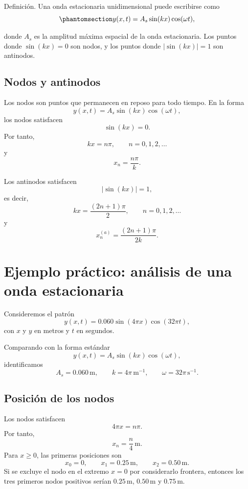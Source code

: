 \documentclass[
  letterpaper,
  DIV=11,
  numbers=noendperiod]{scrreprt}
\begin{document}
\begin{tcolorbox}[enhanced jigsaw, bottomrule=.15mm, rightrule=.15mm, colframe=quarto-callout-note-color-frame, leftrule=.75mm, breakable, arc=.35mm, toprule=.15mm, left=2mm, colback=white, opacityback=0]

Definición. Una onda estacionaria unidimensional puede escribirse como
\begin{equation}\phantomsection\label{eq-standing-wave}{
y(x,t)=A_s\sin(kx)\cos(\omega t),
}\end{equation}

\end{tcolorbox}

donde \(A_s\) es la amplitud máxima espacial de la onda estacionaria.
Los puntos donde \(\sin(kx)=0\) son nodos, y los puntos donde
\(|\sin(kx)|=1\) son antinodos.

\subsection{Nodos y antinodos}\label{nodos-y-antinodos}

Los nodos son puntos que permanecen en reposo para todo tiempo. En la
forma \[
y(x,t)=A_s\sin(kx)\cos(\omega t),
\] los nodos satisfacen \[
\sin(kx)=0.
\] Por tanto, \[
kx=n\pi, \qquad n=0,1,2,\dots
\] y \[
x_n=\frac{n\pi}{k}.
\]

Los antinodos satisfacen \[
|\sin(kx)|=1,
\] es decir, \[
kx=\frac{(2n+1)\pi}{2}, \qquad n=0,1,2,\dots
\] y \[
x_n^{(a)}=\frac{(2n+1)\pi}{2k}.
\]

\section{Ejemplo práctico: análisis de una onda
estacionaria}\label{ejemplo-pruxe1ctico-anuxe1lisis-de-una-onda-estacionaria}

Consideremos el patrón \[
y(x,t)=0.060\sin(4\pi x)\cos(32\pi t),
\] con \(x\) y \(y\) en metros y \(t\) en segundos.

Comparando con la forma estándar \[
y(x,t)=A_s\sin(kx)\cos(\omega t),
\] identificamos \[
A_s=0.060\,\text{m}, \qquad k=4\pi\,\text{m}^{-1}, \qquad \omega=32\pi\,\text{s}^{-1}.
\]

\subsection{Posición de los nodos}\label{posiciuxf3n-de-los-nodos}

Los nodos satisfacen \[
4\pi x=n\pi.
\] Por tanto, \[
x_n=\frac{n}{4}\,\text{m}.
\] Para \(x\geq 0\), las primeras posiciones son \[
x_0=0, \qquad x_1=0.25\,\text{m}, \qquad x_2=0.50\,\text{m}.
\] Si se excluye el nodo en el extremo \(x=0\) por considerarlo
frontera, entonces los tres primeros nodos positivos serían
\(0.25\,\text{m}\), \(0.50\,\text{m}\) y \(0.75\,\text{m}\).
\end{document}
